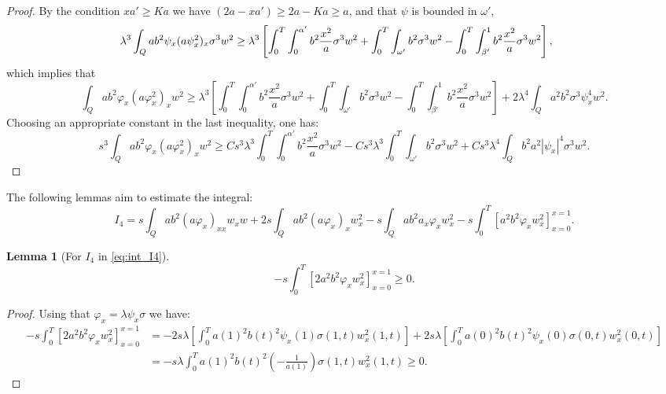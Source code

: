\documentclass[11pt,oneside,a4papper]{osajnl}
\newtheorem{lema}{Lemma}
\begin{document}
\begin{proof}
    By the condition $xa'\geq Ka$ we have $(2a-xa')\geq 2a-Ka\geq a$, and that $\psi$ is bounded in $\omega'$,
	\begin{eqnarray*}
		\hspace*{-0.5cm}\lambda^3\int_{Q} ab^2 \psi_x (a\psi_x^2)_x\sigma^3w^2 \geq \lambda^3 \left[\int_0^T \int_0^{\alpha'} b^2 \frac{x^2}{a}\sigma^3w^2 +  \int_0^T\int_{\omega'} b^2 \sigma^3w^2 -  \int_0^T \int_{\beta'}^1 b^2 \frac{x^2}{a}\sigma^3w^2\right],
	\end{eqnarray*}
    which implies that
	\begin{equation*}
		\int_{Q} ab^2\varphi_x (a\varphi_x^2)_x  w^2\geq\lambda^3 \left[\int_0^T \int_0^{\alpha'} b^2 \frac{x^2}{a}\sigma^3w^2 +  \int_0^T\int_{\omega'} b^2 \sigma^3w^2 -  \int_0^T \int_{\beta'}^1 b^2 \frac{x^2}{a}\sigma^3w^2\right]+2\lambda^4\int_{Q} a^2b^2\sigma^3\psi_x^4  w^2.
	\end{equation*}
	Choosing an appropriate constant in the last inequality, one has: 
	$$s^3\int_{Q} ab^2\varphi_x (a\varphi_x^2)_x  w^2\geq
	C s^3 \lambda^3 \int_0^T \int_0^{\alpha'} b^2 \frac{x^2}{a} \sigma^3 w^2 - Cs^3\lambda^3 \int_0^T\int_{\omega'} b^2 \sigma^3 w^2 + C s^3 \lambda^4 \int_Q b^2 a^2 |\psi_x|^4 \sigma^3 w^2.$$
\end{proof}

The following lemmas aim to estimate the integral:
\begin{equation}
\label{eq:int_I4}
I_4=s\int_{Q}ab^2(a\varphi_x)_{xx} w_x w+2s\int_{Q}ab^2(a\varphi_x )_xw_x^2-s\int_{Q}ab^2 a_x \varphi_xw_{x}^2-s\int_{0}^{T}\left[a^2b^2\varphi_x w_x^2\right]^{x=1}_{x=0}.
\end{equation}

\begin{lema}[For $I_4$ in \eqref{eq:int_I4}]\label{lemaA5}
	\begin{equation*}
		-s \int_{0}^{T}\left[2a^2b^2\varphi_x w_x^2\right]^{x=1}_{x=0} \geq 0.
	\end{equation*}
\end{lema}
\begin{proof}
	Using that $\varphi_x=\lambda \psi_x \sigma$ we have:
	\begin{equation*}
    \begin{split}
		-s \int_{0}^{T}\left[2a^2b^2\varphi_x w_x^2\right]^{x=1}_{x=0} &= -2s\lambda \left[ \int_{0}^{T}a(1)^2b(t)^2 \psi_x(1) \sigma(1,t) w_x^2(1,t) \right]
		+2s\lambda \left[ \int_{0}^{T}a(0)^2b(t)^2 \psi_x(0) \sigma(0,t) w_x^2(0,t) \right] \\
        &=-s\lambda\int_{0}^{T}a(1)^2b(t)^2 \left(-\frac{1}{a(1)}\right) \sigma(1,t) w_x^2(1,t) \geq 0. 
    \end{split}    
	\end{equation*}
\end{proof}
\end{document}
